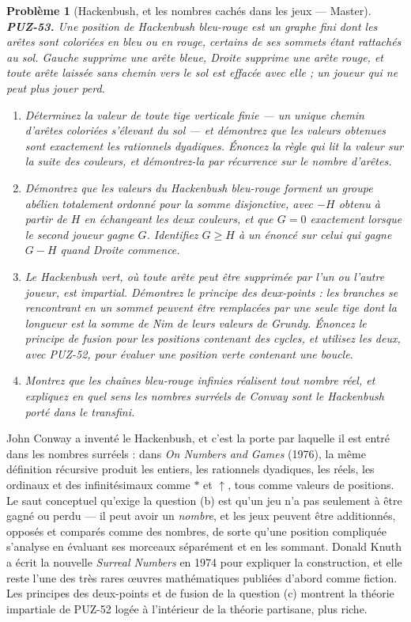 \documentclass[11pt]{article}
\newtheorem{problem}{Problème}
\begin{document}
\bigskip

\begin{problem}[{Hackenbush, et les nombres cachés dans les jeux --- Master}]
\textbf{PUZ-53.} Une position de Hackenbush bleu-rouge est un graphe fini dont les arêtes
sont coloriées en bleu ou en rouge, certains de ses sommets étant rattachés au sol. Gauche
supprime une arête bleue, Droite supprime une arête rouge, et toute arête laissée sans chemin
vers le sol est effacée avec elle ; un joueur qui ne peut plus jouer perd.
\begin{enumerate}
\item[(a)] Déterminez la valeur de toute tige verticale finie --- un unique chemin d'arêtes coloriées
s'élevant du sol --- et démontrez que les valeurs obtenues sont exactement les rationnels
dyadiques. Énoncez la règle qui lit la valeur sur la suite des couleurs, et démontrez-la par
récurrence sur le nombre d'arêtes.
\item[(b)] Démontrez que les valeurs du Hackenbush bleu-rouge forment un groupe abélien totalement
ordonné pour la somme disjonctive, avec $ -H $ obtenu à partir de $ H $ en échangeant les
deux couleurs, et que $ G = 0 $ exactement lorsque le second joueur gagne $ G $.
Identifiez $ G \ge H $ à un énoncé sur celui qui gagne $ G - H $ quand Droite commence.
\item[(c)] Le Hackenbush vert, où toute arête peut être supprimée par l'un ou l'autre joueur, est
impartial. Démontrez le principe des deux-points : les branches se rencontrant en un sommet
peuvent être remplacées par une seule tige dont la longueur est la somme de Nim de leurs
valeurs de Grundy. Énoncez le principe de fusion pour les positions contenant des cycles, et
utilisez les deux, avec PUZ-52, pour évaluer une position verte contenant une boucle.
\item[(d)] Montrez que les chaînes bleu-rouge infinies réalisent tout nombre réel, et expliquez en
quel sens les nombres surréels de Conway sont le Hackenbush porté dans le transfini.
\end{enumerate}

\end{problem}

\noindent John Conway a inventé le Hackenbush, et c'est la porte par laquelle il est
entré dans les nombres surréels : dans \textit{On Numbers and Games} (1976), la même définition
récursive produit les entiers, les rationnels dyadiques, les réels, les ordinaux et des
infinitésimaux comme $ \ast $ et $ \uparrow $, tous comme valeurs de positions. Le saut
conceptuel qu'exige la question (b) est qu'un jeu n'a pas seulement à être gagné ou perdu --- il
peut avoir un \textit{nombre}, et les jeux peuvent être additionnés, opposés et comparés comme
des nombres, de sorte qu'une position compliquée s'analyse en évaluant ses morceaux séparément
et en les sommant. Donald Knuth a écrit la nouvelle \textit{Surreal Numbers} en 1974 pour
expliquer la construction, et elle reste l'une des très rares \oe{}uvres mathématiques publiées
d'abord comme fiction. Les principes des deux-points et de fusion de la question (c) montrent
la théorie impartiale de PUZ-52 logée à l'intérieur de la théorie partisane, plus riche.
\end{document}

